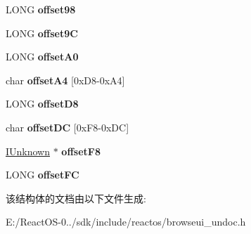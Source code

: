 \begin{DoxyCompactItemize}
L\+O\+NG {\bfseries offset98}
\item 
\mbox{\label{struct_i_e_thread_param_block_ab353ad595fdf512d4de10198317c7ad5}} 
L\+O\+NG {\bfseries offset9C}
\item 
\mbox{\label{struct_i_e_thread_param_block_abca6eb32474a82bd71242ae637901a26}} 
L\+O\+NG {\bfseries offset\+A0}
\item 
\mbox{\label{struct_i_e_thread_param_block_a17eeba91d24fe53705822359b1b5cc8b}} 
char {\bfseries offset\+A4} \mbox{[}0x\+D8-\/0x\+A4\mbox{]}
\item 
\mbox{\label{struct_i_e_thread_param_block_a48c9fb95f4076fe1fbc0d5e97f1a580b}} 
L\+O\+NG {\bfseries offset\+D8}
\item 
\mbox{\label{struct_i_e_thread_param_block_a9847c399eefdb1d4c039987f5f7655cd}} 
char {\bfseries offset\+DC} \mbox{[}0x\+F8-\/0x\+D\+C\mbox{]}
\item 
\mbox{\label{struct_i_e_thread_param_block_a43d225de5d66417353acf4cc7483cc6f}} 
\hyperlink{interface_i_unknown}{I\+Unknown} $\ast$ {\bfseries offset\+F8}
\item 
\mbox{\label{struct_i_e_thread_param_block_ac07c504d933a6221c7038991238f424a}} 
L\+O\+NG {\bfseries offset\+FC}
\end{DoxyCompactItemize}


该结构体的文档由以下文件生成\+:\begin{DoxyCompactItemize}
\item 
E\+:/\+React\+O\+S-\/0../sdk/include/reactos/browseui\+\_\+undoc.\+h\end{DoxyCompactItemize}
